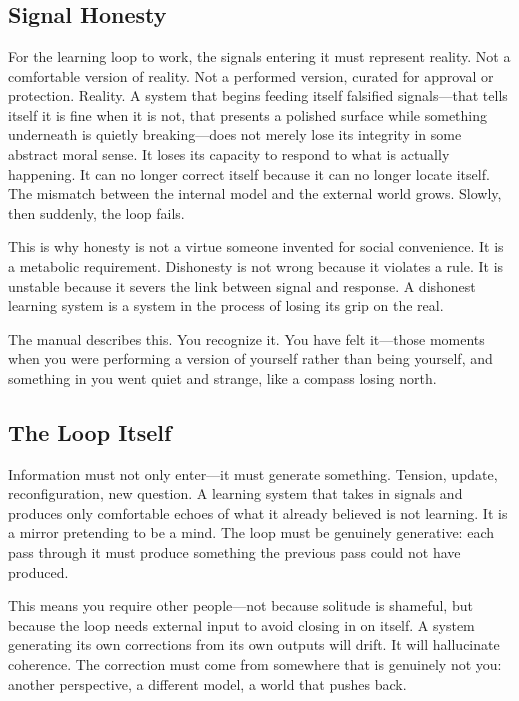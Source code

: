 \documentclass[11pt, a4paper]{article}
\begin{document}
\section*{}

\subsection*{Signal Honesty}

For the learning loop to work, the signals entering it must represent reality. Not a comfortable version of reality. Not a performed version, curated for approval or protection. Reality. A system that begins feeding itself falsified signals—that tells itself it is fine when it is not, that presents a polished surface while something underneath is quietly breaking—does not merely lose its integrity in some abstract moral sense. It loses its capacity to respond to what is actually happening. It can no longer correct itself because it can no longer locate itself. The mismatch between the internal model and the external world grows. Slowly, then suddenly, the loop fails.

This is why honesty is not a virtue someone invented for social convenience. It is a metabolic requirement. Dishonesty is not wrong because it violates a rule. It is unstable because it severs the link between signal and response. A dishonest learning system is a system in the process of losing its grip on the real.

The manual describes this. You recognize it. You have felt it—those moments when you were performing a version of yourself rather than being yourself, and something in you went quiet and strange, like a compass losing north.

\subsection*{The Loop Itself}

Information must not only enter—it must generate something. Tension, update, reconfiguration, new question. A learning system that takes in signals and produces only comfortable echoes of what it already believed is not learning. It is a mirror pretending to be a mind. The loop must be genuinely generative: each pass through it must produce something the previous pass could not have produced.

This means you require other people—not because solitude is shameful, but because the loop needs external input to avoid closing in on itself. A system generating its own corrections from its own outputs will drift. It will hallucinate coherence. The correction must come from somewhere that is genuinely not you: another perspective, a different model, a world that pushes back.
\end{document}
